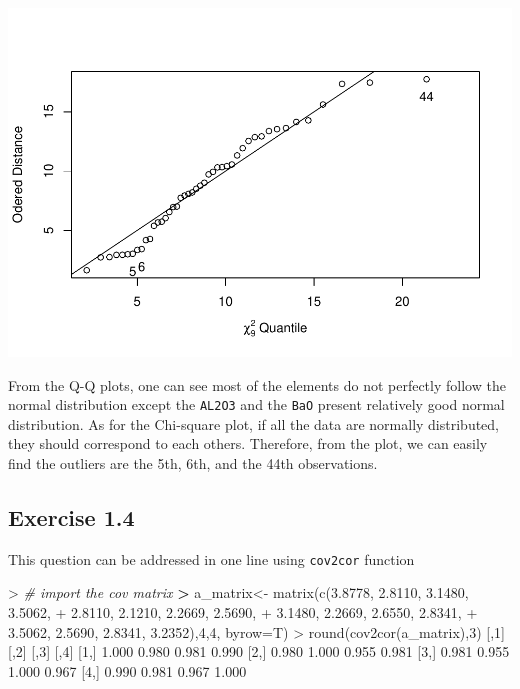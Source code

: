\documentclass[
]{article}
\newenvironment{Shaded}{\begin{snugshade}}{\end{snugshade}}
\newcommand{\AttributeTok}[1]{\textcolor[rgb]{0.77,0.63,0.00}{#1}}
\newcommand{\CommentTok}[1]{\textcolor[rgb]{0.56,0.35,0.01}{\textit{#1}}}
\newcommand{\DecValTok}[1]{\textcolor[rgb]{0.00,0.00,0.81}{#1}}
\newcommand{\ErrorTok}[1]{\textcolor[rgb]{0.64,0.00,0.00}{\textbf{#1}}}
\newcommand{\FloatTok}[1]{\textcolor[rgb]{0.00,0.00,0.81}{#1}}
\newcommand{\FunctionTok}[1]{\textcolor[rgb]{0.00,0.00,0.00}{#1}}
\newcommand{\NormalTok}[1]{#1}
\newcommand{\OtherTok}[1]{\textcolor[rgb]{0.56,0.35,0.01}{#1}}
\newcommand{\SpecialCharTok}[1]{\textcolor[rgb]{0.00,0.00,0.00}{#1}}
\begin{document}
\includegraphics[width=0.5\linewidth,height=0.5\textheight]{hudm6122_hw_01_ChenguangPan_files/figure-latex/unnamed-chunk-4-1}

From the Q-Q plots, one can see most of the elements do not perfectly
follow the normal distribution except the \texttt{AL2O3} and the
\texttt{BaO} present relatively good normal distribution. As for the
Chi-square plot, if all the data are normally distributed, they should
correspond to each others. Therefore, from the plot, we can easily find
the outliers are the 5th, 6th, and the 44th observations.

\hypertarget{exercise-1.4}{%
\subsection{Exercise 1.4}\label{exercise-1.4}}

This question can be addressed in one line using \texttt{cov2cor}
function

\begin{Shaded}
\begin{Highlighting}[]
\SpecialCharTok{\textgreater{}} \CommentTok{\# import the cov matrix}
\ErrorTok{\textgreater{}}\NormalTok{ a\_matrix}\OtherTok{\textless{}{-}} \FunctionTok{matrix}\NormalTok{(}\FunctionTok{c}\NormalTok{(}\FloatTok{3.8778}\NormalTok{, }\FloatTok{2.8110}\NormalTok{, }\FloatTok{3.1480}\NormalTok{, }\FloatTok{3.5062}\NormalTok{,}
\SpecialCharTok{+}                     \FloatTok{2.8110}\NormalTok{, }\FloatTok{2.1210}\NormalTok{, }\FloatTok{2.2669}\NormalTok{, }\FloatTok{2.5690}\NormalTok{,}
\SpecialCharTok{+}                     \FloatTok{3.1480}\NormalTok{, }\FloatTok{2.2669}\NormalTok{, }\FloatTok{2.6550}\NormalTok{, }\FloatTok{2.8341}\NormalTok{,}
\SpecialCharTok{+}                     \FloatTok{3.5062}\NormalTok{, }\FloatTok{2.5690}\NormalTok{, }\FloatTok{2.8341}\NormalTok{, }\FloatTok{3.2352}\NormalTok{),}\DecValTok{4}\NormalTok{,}\DecValTok{4}\NormalTok{, }\AttributeTok{byrow=}\NormalTok{T)}
\SpecialCharTok{\textgreater{}} \FunctionTok{round}\NormalTok{(}\FunctionTok{cov2cor}\NormalTok{(a\_matrix),}\DecValTok{3}\NormalTok{)}
\NormalTok{      [,}\DecValTok{1}\NormalTok{]  [,}\DecValTok{2}\NormalTok{]  [,}\DecValTok{3}\NormalTok{]  [,}\DecValTok{4}\NormalTok{]}
\NormalTok{[}\DecValTok{1}\NormalTok{,] }\FloatTok{1.000} \FloatTok{0.980} \FloatTok{0.981} \FloatTok{0.990}
\NormalTok{[}\DecValTok{2}\NormalTok{,] }\FloatTok{0.980} \FloatTok{1.000} \FloatTok{0.955} \FloatTok{0.981}
\NormalTok{[}\DecValTok{3}\NormalTok{,] }\FloatTok{0.981} \FloatTok{0.955} \FloatTok{1.000} \FloatTok{0.967}
\NormalTok{[}\DecValTok{4}\NormalTok{,] }\FloatTok{0.990} \FloatTok{0.981} \FloatTok{0.967} \FloatTok{1.000}
\end{Highlighting}
\end{Shaded}
\end{document}
